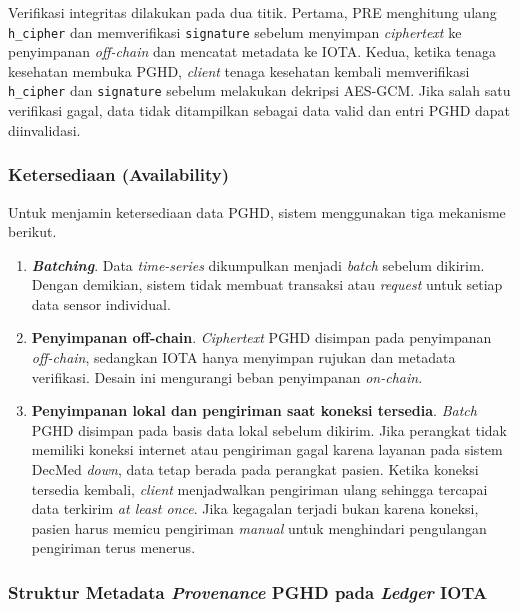 Verifikasi integritas dilakukan pada dua titik.
Pertama, PRE menghitung ulang \texttt{h\_cipher} dan memverifikasi \texttt{signature} sebelum menyimpan \textit{ciphertext} ke penyimpanan \textit{off-chain} dan mencatat metadata ke IOTA\@.
Kedua, ketika tenaga kesehatan membuka PGHD, \textit{client} tenaga kesehatan kembali memverifikasi \texttt{h\_cipher} dan \texttt{signature} sebelum melakukan dekripsi AES-GCM\@.
Jika salah satu verifikasi gagal, data tidak ditampilkan sebagai data valid dan entri PGHD dapat diinvalidasi.

\subsubsection{Ketersediaan (Availability)}

Untuk menjamin ketersediaan data PGHD, sistem menggunakan tiga mekanisme berikut.

\begin{enumerate}
	\item \textbf{\textit{Batching}}.
	      Data \textit{time-series} dikumpulkan menjadi \textit{batch} sebelum dikirim.
	      Dengan demikian, sistem tidak membuat transaksi atau \textit{request} untuk setiap data sensor individual.

	\item \textbf{Penyimpanan off-chain}.
	      \textit{Ciphertext} PGHD disimpan pada penyimpanan \textit{off-chain}, sedangkan IOTA hanya menyimpan rujukan dan metadata verifikasi.
	      Desain ini mengurangi beban penyimpanan \textit{on-chain}.

	\item \textbf{Penyimpanan lokal dan pengiriman saat koneksi tersedia}.
	      \textit{Batch} PGHD disimpan pada basis data lokal sebelum dikirim.
	      Jika perangkat tidak memiliki koneksi internet atau pengiriman gagal karena layanan pada sistem DecMed \textit{down}, data tetap berada pada perangkat pasien.
	      Ketika koneksi tersedia kembali, \textit{client} menjadwalkan pengiriman ulang sehingga tercapai data terkirim \textit{at least once}.
	      Jika kegagalan terjadi bukan karena koneksi, pasien harus memicu pengiriman \textit{manual} untuk menghindari pengulangan pengiriman terus menerus.
\end{enumerate}


\subsubsection{Struktur Metadata \textit{Provenance} PGHD pada \textit{Ledger} IOTA}

